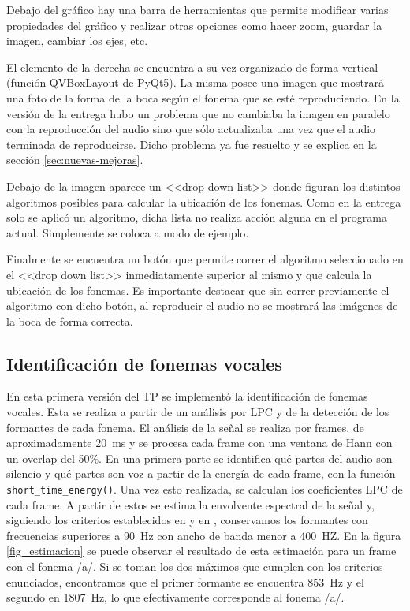 \documentclass{article}
\begin{document}
Debajo del gráfico hay una barra de herramientas que permite modificar varias propiedades del gráfico y realizar otras opciones como hacer zoom, guardar la imagen, cambiar los ejes, etc.

El elemento de la derecha se encuentra a su vez organizado de forma vertical (función QVBoxLayout de PyQt5). La misma posee una imagen que mostrará una foto de la forma de la boca según el fonema que se esté reproduciendo. En la versión de la entrega hubo un problema que no cambiaba la imagen en paralelo con la reproducción del audio sino que sólo actualizaba una vez que el audio terminada de reproducirse. Dicho problema ya fue resuelto y se explica en la sección \ref{sec:nuevas-mejoras}.

Debajo de la imagen aparece un <<drop down list>> donde figuran los distintos algoritmos posibles para calcular la ubicación de los fonemas. Como en la entrega solo se aplicó un algoritmo, dicha lista no realiza acción alguna en el programa actual. Simplemente se coloca a modo de ejemplo.

Finalmente se encuentra un botón que permite correr el algoritmo seleccionado en el <<drop down list>> inmediatamente superior al mismo y que calcula la ubicación de los fonemas. Es importante destacar que sin correr previamente el algoritmo con dicho botón, al reproducir el audio no se mostrará las imágenes de la boca de forma correcta.

\subsection*{Identificación de fonemas vocales}

En esta primera versión del TP se implementó la identificación de fonemas vocales. Esta se realiza a partir de un análisis por LPC y de la detección de los formantes de cada fonema. El análisis de la señal se realiza por frames, de aproximadamente \SI{20}{ms} y se procesa cada frame con una ventana de Hann con un overlap del 50\%. En una primera parte se identifica qué partes del audio son silencio y qué partes son voz a partir de la energía de cada frame, con la función \texttt{short\_time\_energy()}. Una vez esto realizada, se calculan los coeficientes LPC de cada frame. A partir de estos se estima la envolvente espectral de la señal y, siguiendo los criterios establecidos en \cite{snell1993formant} y en \cite{mathworks1}, conservamos los formantes con frecuencias superiores a \SI{90}{Hz} con ancho de banda menor a \SI{400}{HZ}. En la figura \ref{fig_estimacion} se puede observar el resultado de esta estimación para un frame con el fonema /a/. Si se toman los dos máximos que cumplen con los criterios enunciados, encontramos que el primer formante se encuentra \SI{853}{Hz} y el segundo en \SI{1807}{Hz}, lo que efectivamente corresponde al fonema /a/.
\end{document}

